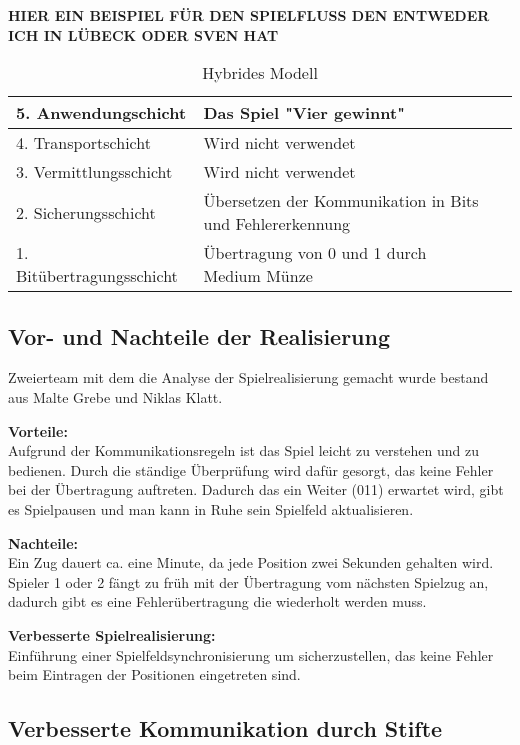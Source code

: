 \documentclass{scrartcl}
\begin{document}
  \textbf{HIER EIN BEISPIEL FÜR DEN SPIELFLUSS DEN ENTWEDER ICH IN LÜBECK ODER SVEN HAT}
  
 \begin{table}
    \centering
    \caption{Hybrides Modell}
    \begin{tabular}{l|ll}
      5. Anwendungschicht & Das Spiel "Vier gewinnt" \\ \hline
      4. Transportschicht & Wird nicht verwendet \\ \hline
      3. Vermittlungsschicht & Wird nicht verwendet \\ \hline
      2. Sicherungsschicht & Übersetzen der Kommunikation in Bits und Fehlererkennung \\ \hline
      1. Bitübertragungsschicht & Übertragung von 0 und 1 durch Medium Münze\\ 
     \end{tabular}
\end{table}

 \subsection[Aufgabe 4 Vor- und Nachteile der Realisierung]{Vor- und Nachteile der Realisierung}

Zweierteam mit dem die Analyse der Spielrealisierung gemacht wurde bestand aus Malte Grebe und Niklas Klatt. 
 
 \textbf{Vorteile:}\\
 Aufgrund der Kommunikationsregeln ist das Spiel leicht zu verstehen und zu bedienen. Durch die ständige Überprüfung wird dafür gesorgt, das keine Fehler bei der Übertragung auftreten. Dadurch das ein Weiter (011) erwartet wird, gibt es Spielpausen und man kann in Ruhe sein Spielfeld aktualisieren. 
 
 \textbf{Nachteile:}\\
  Ein Zug dauert ca. eine Minute, da jede Position zwei Sekunden gehalten wird. Spieler 1 oder 2 fängt zu früh mit der Übertragung vom nächsten Spielzug an, dadurch gibt es eine Fehlerübertragung die wiederholt werden muss.
  
  \textbf{Verbesserte Spielrealisierung:}\\
  Einführung einer Spielfeldsynchronisierung um sicherzustellen, das keine Fehler beim Eintragen der Positionen eingetreten sind. 
  
  \subsection[Aufgabe 5 Verbesserte Kommunikation durch Stifte]{Verbesserte Kommunikation durch Stifte}
  
\end{document}
